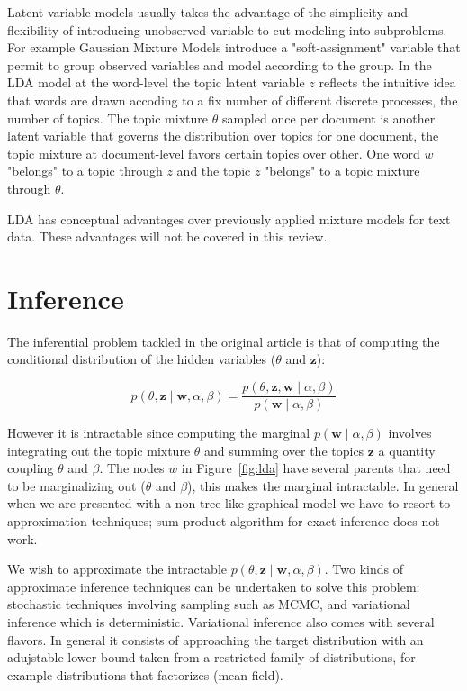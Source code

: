\documentclass[12pt,a4paper,onecolumn]{article}
\begin{document}
Latent variable models usually takes the advantage of the simplicity and flexibility of introducing unobserved variable to cut modeling into subproblems. For example Gaussian Mixture Models introduce a "soft-assignment" variable that permit to group observed variables and model according to the group. In the LDA model at the word-level the topic latent variable $z$ reflects the intuitive idea that words are drawn accoding to a fix number of different discrete processes, the number of topics. The topic mixture $\theta$ sampled once per document is another latent variable that governs the distribution over topics for one document, the topic mixture at document-level favors certain topics over other. One word $w$ "belongs" to a topic through $z$ and the topic $z$ "belongs" to a topic mixture through $\theta$.

LDA has conceptual advantages over previously applied mixture models for text data. These advantages will not be covered in this review.

 
 \section{Inference}
\label{sec:inference}

The inferential problem tackled in the original article is that of computing the conditional distribution of the hidden variables ($\theta$ and $\mathbf{z}$):

$$p(\theta, \mathbf{z} \mid \mathbf{w}, \alpha, \beta) = \frac{p(\theta, \mathbf{z}, \mathbf{w} \mid \alpha, \beta)}{p(\mathbf{w} \mid \alpha, \beta)}$$

However it is intractable since computing the marginal $p(\mathbf{w} \mid \alpha, \beta)$ involves integrating out the topic mixture $\theta$ and summing over the topics $\mathbf{z}$ a quantity coupling $\theta$ and $\beta$. The nodes $w$ in Figure~\ref{fig:lda} have several parents that need to be marginalizing out ($\theta$ and $\beta$), this makes the marginal intractable. In general when we are presented with a non-tree like graphical model we have to resort to approximation techniques; sum-product algorithm for exact inference does not work.

We wish to approximate the intractable $p(\theta, \mathbf{z} \mid \mathbf{w}, \alpha, \beta)$. Two kinds of approximate inference techniques can be undertaken to solve this problem: stochastic techniques involving sampling such as MCMC, and variational inference which is deterministic. Variational inference also comes with several flavors. In general it consists of approaching the target distribution with an adujstable lower-bound taken from a restricted family of distributions, for example distributions that factorizes (mean field).
\end{document}
